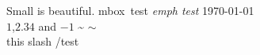 \documentclass{article}
\begin{document}
Small is beautiful.
\mbox{mbox test}
\emph{emph test}
\today
\\
$1$,$2.34$ and $-1$
\~{}
$\sim$
\\
this slash \slash test
\\
\end{document}
